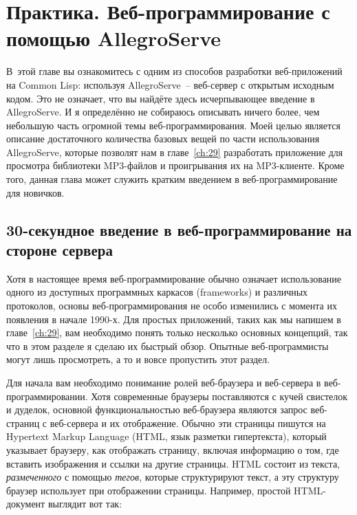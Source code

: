 \chapter{Практика. Веб-программирование с помощью AllegroServe}
\label{ch:26}

\thispagestyle{empty}

В~этой главе вы ознакомитесь с одним из способов разработки веб-приложений на Common Lisp:
используя AllegroServe~-- веб-сервер с открытым исходным кодом. Это не означает, что вы
найдёте здесь исчерпывающее введение в AllegroServe. И я определённо не собираюсь
описывать ничего более, чем небольшую часть огромной темы веб-программирования. Моей целью
является описание достаточного количества базовых вещей по части использования
AllegroServe, которые позволят нам в главе~\ref{ch:29} разработать приложение для
просмотра библиотеки MP3-файлов и проигрывания их на MP3-клиенте. Кроме того, данная глава
может служить кратким введением в веб-программирование для новичков.

\section{30-секундное введение в веб-программирование на стороне сервера}

Хотя в настоящее время веб-программирование обычно означает использование одного из
доступных программных каркасов (frameworks) и различных протоколов, основы
веб-программирования не особо изменились с момента их появления в начале 1990-х. Для
простых приложений, таких как мы напишем в главе~\ref{ch:29}, вам необходимо понять только
несколько основных концепций, так что в этом разделе я сделаю их быстрый обзор. Опытные
веб-программисты могут лишь просмотреть, а то и вовсе пропустить этот
раздел.

Для начала вам необходимо понимание ролей веб-браузера и веб-сервера в
веб-программировании. Хотя современные браузеры поставляются с кучей свистелок и дуделок,
основной функциональностью веб-браузера являются запрос веб-страниц с веб-сервера и их
отображение. Обычно эти страницы пишутся на Hypertext Markup Language (HTML, язык разметки
гипертекста), который указывает браузеру, как отображать страницу, включая информацию о
том, где вставить изображения и ссылки на другие страницы. HTML состоит из текста,
\textit{размеченного} с помощью \textit{тегов}, которые структурируют текст, а эту
структуру браузер использует при отображении страницы. Например, простой HTML-документ
выглядит вот так:

